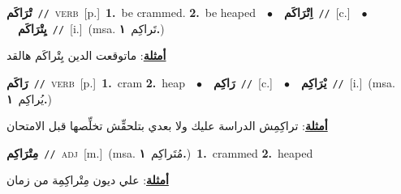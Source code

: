 \documentclass[10pt,a4paper,twoside]{article} %
\begin{document}
\begin{multicols}{2}
{\setlength\topsep{0pt}\textbf{\foreignlanguage{arabic}{تْرَاكَم}}\ {\color{gray}\texttt{//}\color{black}}\ \textsc{verb}\ [p.]\ \textbf{1.}~be crammed.  \textbf{2.}~be heaped\ \ $\bullet$\ \ \setlength\topsep{0pt}\textbf{\foreignlanguage{arabic}{اِتْرَاكَم}}\ {\color{gray}\texttt{//}\color{black}}\ [c.]\ \ $\bullet$\ \ \setlength\topsep{0pt}\textbf{\foreignlanguage{arabic}{يِتْرَاكَم}}\ {\color{gray}\texttt{//}\color{black}}\ [i.]\ \color{gray}(msa. \foreignlanguage{arabic}{تَراكِم}~\foreignlanguage{arabic}{\textbf{١.}})\color{black}\  \begin{flushright}\color{gray}\foreignlanguage{arabic}{\textbf{\underline{\foreignlanguage{arabic}{أمثلة}}}: ماتوقعت الدين يِتْراكَم هالقد}\end{flushright}\color{black}} \vspace{2mm}

{\setlength\topsep{0pt}\textbf{\foreignlanguage{arabic}{رَاكَم}}\ {\color{gray}\texttt{//}\color{black}}\ \textsc{verb}\ [p.]\ \textbf{1.}~cram  \textbf{2.}~heap\ \ $\bullet$\ \ \setlength\topsep{0pt}\textbf{\foreignlanguage{arabic}{رَاكِم}}\ {\color{gray}\texttt{//}\color{black}}\ [c.]\ \ $\bullet$\ \ \setlength\topsep{0pt}\textbf{\foreignlanguage{arabic}{يْرَاكِم}}\ {\color{gray}\texttt{//}\color{black}}\ [i.]\ \color{gray}(msa. \foreignlanguage{arabic}{يُراكِم}~\foreignlanguage{arabic}{\textbf{١.}})\color{black}\  \begin{flushright}\color{gray}\foreignlanguage{arabic}{\textbf{\underline{\foreignlanguage{arabic}{أمثلة}}}: تراكِمِش الدراسة عليك ولا بعدي بتلحقِّش تخلِّصها قبل الامتحان}\end{flushright}\color{black}} \vspace{2mm}

{\setlength\topsep{0pt}\textbf{\foreignlanguage{arabic}{مِتْرَاكِم}}\ {\color{gray}\texttt{//}\color{black}}\ \textsc{adj}\ [m.]\ \color{gray}(msa. \foreignlanguage{arabic}{مُتَراكِم}~\foreignlanguage{arabic}{\textbf{١.}})\color{black}\ \textbf{1.}~crammed  \textbf{2.}~heaped\  \begin{flushright}\color{gray}\foreignlanguage{arabic}{\textbf{\underline{\foreignlanguage{arabic}{أمثلة}}}: علي ديون مِتْراكِمِة من زمان}\end{flushright}\color{black}} \vspace{2mm}


\end{multicols}
\end{document}

